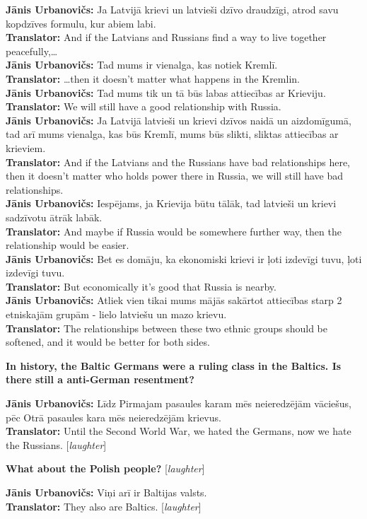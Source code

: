 \textbf{Jānis Urbanovičs:} Ja Latvijā krievi un latvieši dzīvo draudzīgi, atrod savu kopdzīves formulu, kur abiem labi.\\  
\textbf{Translator:} And if the Latvians and Russians find a way to live together peacefully,…\\ 
\textbf{Jānis Urbanovičs:} Tad mums ir vienalga, kas notiek Kremlī.\\ 
\textbf{Translator:} …then it doesn't matter what happens in the Kremlin.\\  
\textbf{Jānis Urbanovičs:} Tad mums tik un tā būs labas attiecības ar Krieviju.\\
\textbf{Translator:} We will still have a good relationship with Russia. \\ 
\textbf{Jānis Urbanovičs:} Ja Latvijā latvieši un krievi dzīvos naidā un aizdomīgumā, tad arī mums vienalga, kas būs Kremlī, mums būs slikti, sliktas attiecības ar krieviem.\\ 
\textbf{Translator:} And if the Latvians and the Russians have bad relationships here, then it doesn't matter who holds power there in Russia, we will still have bad relationships.\\  
\textbf{Jānis Urbanovičs:} Iespējams, ja Krievija būtu tālāk, tad latvieši un krievi sadzīvotu ātrāk labāk.\\ 
\textbf{Translator:} And maybe if Russia would be somewhere further way, then the relationship would be easier.\\
\textbf{Jānis Urbanovičs:} Bet es domāju, ka ekonomiski krievi ir ļoti izdevīgi tuvu, ļoti izdevīgi tuvu.\\
\textbf{Translator:} But economically it's good that Russia is nearby.\\ 
\textbf{Jānis Urbanovičs:} Atliek vien tikai mums mājās sakārtot attiecības starp 2 etniskajām grupām - lielo latviešu un mazo krievu.\\  
\textbf{Translator:} The relationships between these two ethnic groups should be softened, and it would be better for both sides. 

\textbf{In history, the Baltic Germans were a ruling class in the Baltics. Is there still a anti-German resentment?} 

\textbf{Jānis Urbanovičs:} Līdz Pirmajam pasaules karam mēs neieredzējām vāciešus, pēc Otrā pasaules kara mēs neieredzējām krievus.\\ 
\textbf{Translator:} Until the Second World War, we hated the Germans, now we hate the Russians. [\textit{laughter}]  

\textbf{What about the Polish people?} [\textit{laughter}]  

\textbf{Jānis Urbanovičs:} Viņi arī ir Baltijas valsts. \\
\textbf{Translator:} They also are Baltics. [\textit{laughter}] 